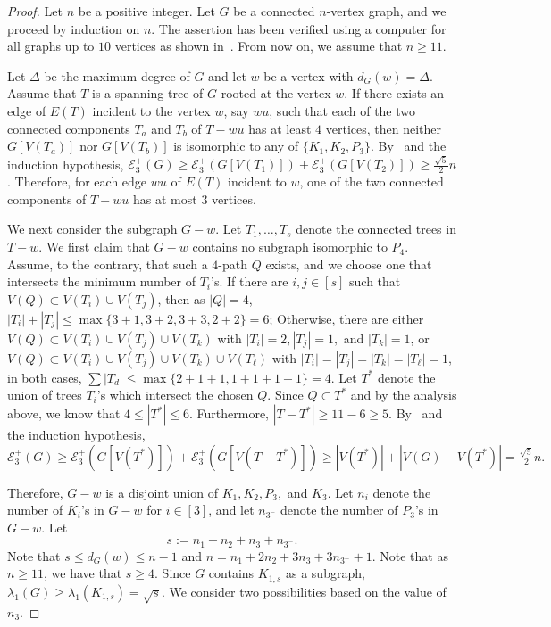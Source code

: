 \documentclass[a4paper,12pt]{article}
\theoremstyle{plain}
\begin{document}
\begin{proof}
Let $n$ be a positive integer. Let $G$ be a connected $n$-vertex graph, and we proceed by induction on $n$. The assertion has been verified using a computer for all graphs up to $10$ vertices as shown in~. From now on, we assume that $n\geq 11$.

Let $\Delta$ be the maximum degree of $G$ and 
let $w$ be a vertex with $d_G(w)=\Delta$. Assume that $T$ is a spanning tree of $G$ rooted at the vertex $w$. If there exists an edge of $E(T)$ incident to the vertex $w$, say $wu$, such that each of the two connected components $T_{a}$ and $T_{b}$ of $T-wu$ has at least $4$ vertices, then neither $G[V(T_{a})]$ nor $G[V(T_{b})]$ is isomorphic to any of $\{K_1, K_2, P_3\}$. By~ and the induction hypothesis, $\mathcal{E}_3^{+}(G)\geq \mathcal{E}_3^{+}(G[V(T_{1})])+ \mathcal{E}_3^{+}(G[V(T_{2})]) \geq \frac{\sqrt{5}}{2}n$. Therefore, for each edge $wu$ of $E(T)$ incident to $w$, one of the two connected components of $T-wu$ has at most $3$ vertices. 


We next consider the subgraph $G-w$. Let $T_1, \ldots, T_s$ denote the connected trees in $T-w$. 
We first claim that $G-w$ contains no subgraph isomorphic to $P_4$. Assume, to the contrary, that such a $4$-path $Q$ exists, and we choose one that intersects the minimum number of $T_i$'s. If there are $i,j\in [s]$ such that $V(Q)\subset V(T_i)\cup V(T_j)$, then as $|Q|=4$, $|T_i|+|T_j|\leq \max\{3+1, 3+2, 3+3, 2+2\}= 6$; Otherwise, there are either $V(Q)\subset V(T_i)\cup V(T_j)\cup V(T_k)$ with $|T_i|=2, |T_j|=1,$ and $|T_k|=1$, or $V(Q)\subset V(T_i)\cup V(T_j)\cup V(T_k)\cup V(T_\ell)$ with $|T_i|=|T_j|=|T_k|=|T_\ell|=1$, in both cases, $\sum |T_d|\leq \max\{2+1+1, 1+1+1+1\}=4$. Let $T^*$ denote the union of trees $T_i$'s which intersect the chosen $Q$. Since $Q\subset T^*$ and by the analysis above, we know that $4\leq |T^*|\leq 6$. Furthermore, $|T-T^*|\geq 11-6\geq 5$. By~ and the induction hypothesis,
$\mathcal{E}^+_3(G)\geq\mathcal{E}^+_3(G[V(T^*)])+\mathcal{E}^+_3(G[V(T-T^*)]) \geq |V(T^*)|+|V(G)-V(T^*)|=\frac{\sqrt{5}}{2}n.$


Therefore, $G-w$ is a disjoint
union of $K_1, K_2, P_3,$ and $K_3$. Let $n_i$ denote the number of $K_i$'s in $G-w$ for $i\in [3]$, and let $n_{3^-}$ denote the number of $P_3$'s in $G-w$. Let $$s:= n_1+n_2+n_3+n_{3^-}.$$ Note that $s\leq d_G(w)\leq n-1$ and $n=n_1+2n_2+3n_3+3n_{3^-}+1$. Note that as $n\geq 11$, we have that $s\geq 4$.
Since $G$ contains $K_{1,s}$ as a subgraph, $\lambda_1(G)\geq\lambda_1(K_{1,s})=\sqrt{s}$. We consider two possibilities based on the value of $n_3$.


\end{proof}
\end{document}
